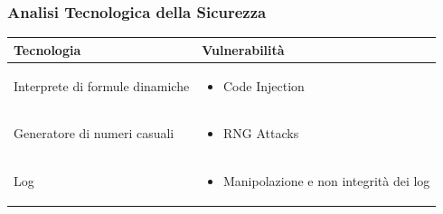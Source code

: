 \documentclass[a4paper, 11pt]{article}
\begin{document}
\subsubsection*{Analisi Tecnologica della Sicurezza}
\begin{center}
    \begin{tabular}{|p{6cm}|p{8cm}|}
        \hline
        \textbf{Tecnologia} & \textbf{Vulnerabilità} \\
        \hline
        Interprete di formule dinamiche & 
        \begin{itemize}
            \item Code Injection
        \end{itemize} \\
        
        \hline
        Generatore di numeri casuali &
        \begin{itemize}
            \item RNG Attacks
        \end{itemize}\\
        
        \hline
        Log &
        \begin{itemize}
            \item Manipolazione e non integrità dei log
        \end{itemize}\\
        \hline 
    \end{tabular}
\end{center}



\newpage
\end{document}
